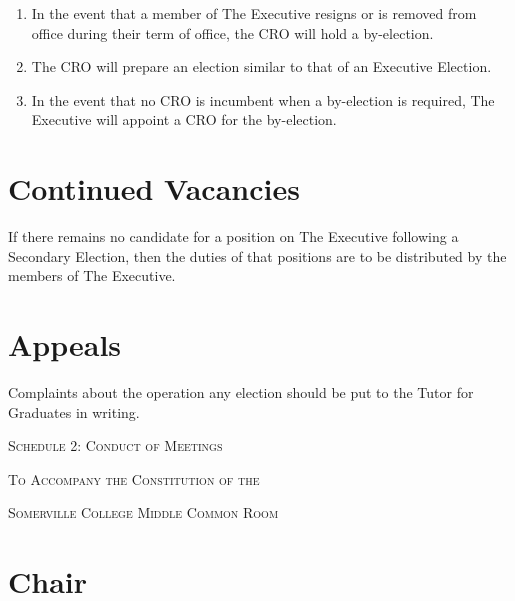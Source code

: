 \documentclass[11pt, a4paper]{article}
\begin{document}
\begin{enumerate}
	\item In the event that a member of The Executive resigns or is removed from office during their term of office, the CRO will hold a by-election.
    \item The CRO will prepare an election similar to that of an Executive Election.
    \item In the event that no CRO is incumbent when a by-election is required, The Executive will appoint a CRO for the by-election.
\end{enumerate}





\section{Continued Vacancies}
\label{sec:continued_vacancies}

If there remains no candidate for a position on The Executive following a Secondary Election, then the duties of that positions are to be distributed by the members of The Executive.





\section{Appeals}
\label{sec:appeals}

Complaints about the operation any election should be put to the Tutor for Graduates in writing.





\clearpage
\setcounter{section}{0}





\centerline{{\Huge \textsc{Schedule 2: Conduct of Meetings}}}
\vspace{2mm}
\centerline{{\Large \textsc{To Accompany the Constitution of the}}}
\vspace{2mm}
\centerline{{\Large \textsc{Somerville College Middle Common Room}}}





\section{Chair}
\label{sec:chair}
\end{document}
